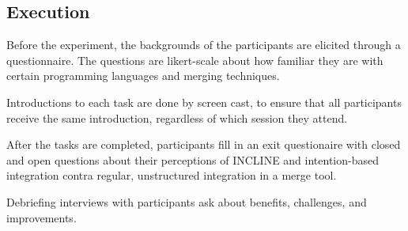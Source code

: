 \subsection{Execution}
Before the experiment, the backgrounds of the participants are elicited through a questionnaire. The questions are likert-scale about how familiar they are with certain programming languages and merging techniques.

Introductions to each task are done by screen cast, to ensure that all participants receive the same introduction, regardless of which session they attend.

After the tasks are completed, participants fill in an exit questionaire with closed and open questions about their perceptions of INCLINE and intention-based integration contra regular, unstructured integration in a merge tool.

Debriefing interviews with participants ask about benefits, challenges, and improvements.
